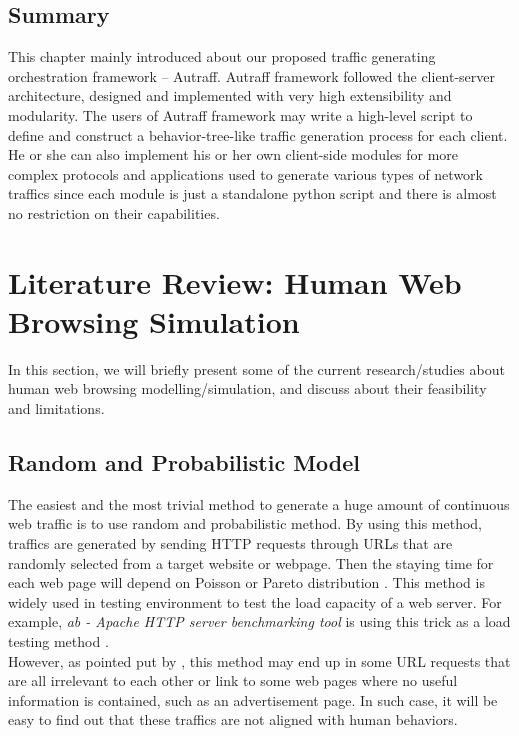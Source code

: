 \documentclass[12pt]{report}
\begin{document}
\section{Summary}
This chapter mainly introduced about our proposed traffic generating orchestration framework -- Autraff. Autraff framework followed the client-server architecture, designed and implemented with very high extensibility and modularity. The users of Autraff framework may write a high-level script to define and construct a behavior-tree-like traffic generation process for each client. He or she can also implement his or her own client-side modules for more complex protocols and applications used to generate various types of network traffics since each module is just a standalone python script and there is almost no restriction on their capabilities.



\chapter{Literature Review: Human Web Browsing Simulation} \label{lr:hwbs}
In this section, we will briefly present some of the current research/studies about human web browsing modelling/simulation, and discuss about their feasibility and limitations.

\section{Random and Probabilistic Model}
The easiest and the most trivial method to generate a huge amount of continuous web traffic is to use random and probabilistic method. By using this method, traffics are generated by sending HTTP requests through URLs that are randomly selected from a target website or webpage. Then the staying time for each web page will depend on Poisson or Pareto distribution \citep{rp-distri}. This method is widely used in testing environment to test the load capacity of a web server. For example, \textit{ab - Apache HTTP server benchmarking tool} is using this trick as a load testing method \citep{Apache-ab}.\\

However, as pointed put by \citet{rp-limit}, this method may end up in some URL requests that are all irrelevant to each other or link to some web pages where no useful information is contained, such as an advertisement page. In such case, it will be easy to find out that these traffics are not aligned with human behaviors.
\end{document}
